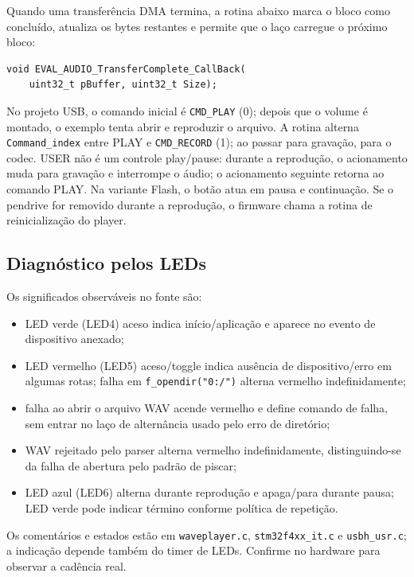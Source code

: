 \documentclass[12pt,journal,compsoc]{IEEEtran}
\newcommand{\funcao}[1]{\path{#1}}
\begin{document}
Quando uma transferência DMA termina, a rotina abaixo marca o bloco como concluído, atualiza os bytes restantes e permite que o laço carregue o próximo bloco:
\begin{lstlisting}
void EVAL_AUDIO_TransferComplete_CallBack(
    uint32_t pBuffer, uint32_t Size);
\end{lstlisting}
No projeto USB, o comando inicial é \texttt{CMD\_PLAY} (0); depois que o volume é montado, o exemplo tenta abrir e reproduzir o arquivo. A rotina \funcao{EXTI0\_IRQHandler()} alterna \texttt{Command\_index} entre PLAY e \texttt{CMD\_RECORD} (1); ao passar para gravação, para o codec. USER não é um controle play/pause: durante a reprodução, o acionamento muda para gravação e interrompe o áudio; o acionamento seguinte retorna ao comando PLAY. Na variante Flash, o botão atua em pausa e continuação. Se o pendrive for removido durante a reprodução, o firmware chama a rotina de reinicialização do player.

\subsection{Diagnóstico pelos LEDs}
Os significados observáveis no fonte são:
\begin{itemize}
\item LED verde (LED4) aceso indica início/aplicação e aparece no evento de dispositivo anexado;
\item LED vermelho (LED5) aceso/toggle indica ausência de dispositivo/erro em algumas rotas; falha em \texttt{f\_opendir("0:/")} alterna vermelho indefinidamente;
\item falha ao abrir o arquivo WAV acende vermelho e define comando de falha, sem entrar no laço de alternância usado pelo erro de diretório;
\item WAV rejeitado pelo parser alterna vermelho indefinidamente, distinguindo-se da falha de abertura pelo padrão de piscar;
\item LED azul (LED6) alterna durante reprodução e apaga/para durante pausa; LED verde pode indicar término conforme política de repetição.
\end{itemize}
Os comentários e estados estão em \texttt{waveplayer.c}, \texttt{stm32f4xx\_it.c} e \texttt{usbh\_usr.c}; a indicação depende também do timer de LEDs. Confirme no hardware para observar a cadência real.
\end{document}
